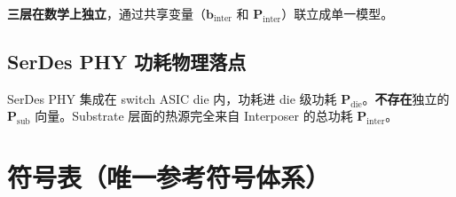 \documentclass[11pt]{article}
\newcommand{\bv}{\mathbf}
\begin{document}
\textbf{三层在数学上独立}，通过共享变量（$\bv{b}_{\text{inter}}$ 和 $\bv{P}_{\text{inter}}$）联立成单一模型。

\subsection{SerDes PHY 功耗物理落点}

SerDes PHY 集成在 switch ASIC die 内，功耗进 die 级功耗 $\bv{P}_{\text{die}}$。\textbf{不存在}独立的 $\bv{P}_{\text{sub}}$ 向量。Substrate 层面的热源完全来自 Interposer 的总功耗 $\bv{P}_{\text{inter}}$。

\section{符号表（唯一参考符号体系）}
\end{document}
